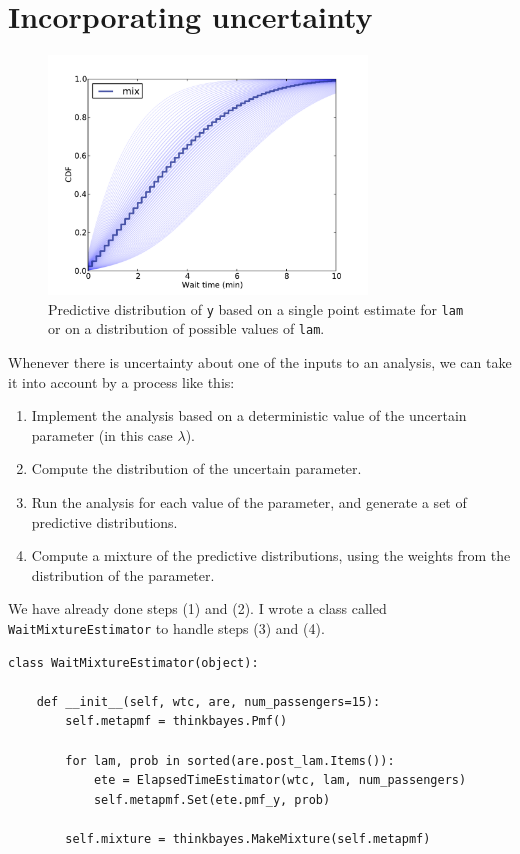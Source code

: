 \documentclass[12pt]{book}
\begin{document}
\section{Incorporating uncertainty}

\begin{figure}
\centerline{\includegraphics[height=2.5in]{figs/redline4.pdf}}
\caption{Predictive distribution of {\tt y} based on a single
point estimate for {\tt lam} or on a distribution
of possible values of {\tt lam}. }
\label{fig.redline4}
\end{figure}

Whenever there is uncertainty about one of the inputs to an analysis,
we can take it into account by a process like this:

\begin{enumerate}

\item Implement the analysis based on a deterministic value of the
  uncertain parameter (in this case $\lambda$).

\item Compute the distribution of the uncertain parameter.

\item Run the analysis for each value of the parameter, and generate a
  set of predictive distributions.

\item Compute a mixture of the predictive distributions, using the
  weights from the distribution of the parameter.

\end{enumerate}

We have already done steps (1) and (2).  I wrote a class
called {\tt WaitMixtureEstimator} to handle steps (3) and (4).

\begin{verbatim}
class WaitMixtureEstimator(object):

    def __init__(self, wtc, are, num_passengers=15):
        self.metapmf = thinkbayes.Pmf()

        for lam, prob in sorted(are.post_lam.Items()):
            ete = ElapsedTimeEstimator(wtc, lam, num_passengers)
            self.metapmf.Set(ete.pmf_y, prob)

        self.mixture = thinkbayes.MakeMixture(self.metapmf)
\end{verbatim}
\end{document}
